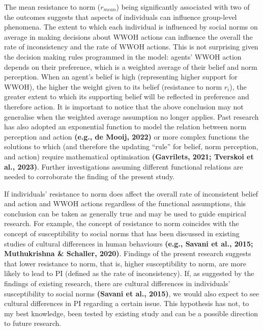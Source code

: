 \documentclass[
  11pt,
]{article}
\begin{document}
The mean resistance to norm (\(r_{mean}\)) being significantly
associated with two of the outcomes suggests that aspects of individuals
can influence group-level phenomena. The extent to which each individual
is influenced by social norms on average in making decisions about WWOH
actions can influence the overall the rate of inconsistency and the rate
of WWOH actions. This is not surprising given the decision making rules
programmed in the model: agents' WWOH action depends on their
preference, which is a weighted average of their belief and norm
perception. When an agent's belief is high (representing higher support
for WWOH), the higher the weight given to its belief (resistance to norm
\(r_i\)), the greater extent to which its supporting belief will be
reflected in preference and therefore action. It is important to notice
that the above conclusion may not generalise when the weighted average
assumption no longer applies. Past research has also adopted an
exponential function to model the relation between norm perception and
action \textbf{(e.g., de Mooij, 2022)} or more complex functions the
solutions to which (and therefore the updating ``rule'' for belief, norm
perception, and action) require mathematical optimisation
\textbf{(Gavrilets, 2021; Tverskoi et al., 2023)}. Further
investigations assuming different functional relations are needed to
corroborate the finding of the present study.

If individuals' resistance to norm does affect the overall rate of
inconsistent belief and action and WWOH actions regardless of the
functional assumptions, this conclusion can be taken as generally true
and may be used to guide empirical research. For example, the concept of
resistance to norm coincides with the concept of susceptibility to
social norms that has been discussed in existing studies of cultural
differences in human behaviours \textbf{(e.g., Savani et al., 2015;
Muthukrishna \& Schaller, 2020)}. Findings of the present research
suggests that lower resistance to norm, that is, higher susceptibility
to norm, are more likely to lead to PI (defined as the rate of
inconsistency). If, as suggested by the findings of existing research,
there are cultural differences in individuals' susceptibility to social
norms \textbf{(Savani et al., 2015)}, we would also expect to see
cultural differences in PI regarding a certain issue. This hypothesis
has not, to my best knowledge, been tested by existing study and can be
a possible direction to future research.
\end{document}
